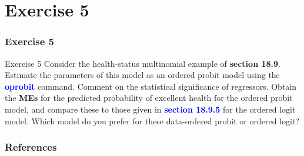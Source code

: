 \documentclass[11pt, aspectratio=169]{beamer}
\begin{document}
	\section{Exercise 5}
		\begin{frame}
			\frametitle{Exercise 5}
			\begin{block}{Exercise 5}
				Consider the health-status multinomial example of \textcolor{red!50}{\textbf{section 18.9}}.
				Estimate the parameters of this model as an ordered probit model using
				the \textcolor{blue}{\textbf{oprobit}} command. Comment on the statistical significance of
				regressors. Obtain the \textbf{MEs} for the predicted probability of excellent
				health for the ordered probit model, and compare these to those given
				in \textcolor{blue}{\textbf{section 18.9.5}} for the ordered logit model. Which model do you
				prefer for these data-ordered probit or ordered logit?
			\end{block}
		\end{frame}
	\begin{frame}[t,allowframebreaks]
		\frametitle{References}
		
		
		\nocite{cameron2022-I}
		\nocite{cameron2022-II}
	\end{frame}
	\begin{frame}
		\maketitle
	\end{frame}
\end{document}
